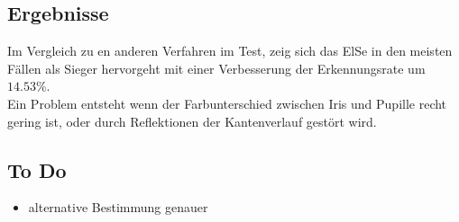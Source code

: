 \subsection{Ergebnisse}
Im Vergleich zu en anderen Verfahren im Test, zeig sich das ElSe in den meisten Fällen als Sieger hervorgeht mit einer Verbesserung der Erkennungsrate um $14.53\%$.\\
Ein Problem entsteht wenn der Farbunterschied zwischen Iris und Pupille recht gering ist, oder durch Reflektionen der Kantenverlauf gestört wird.
\subsection{To Do}
\begin{itemize}
	\item alternative Bestimmung genauer
\end{itemize}